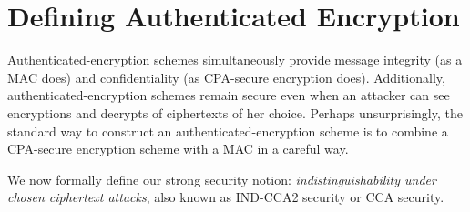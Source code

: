 \section{Defining Authenticated Encryption}

Authenticated-encryption schemes simultaneously provide message 
integrity (as a MAC does) and confidentiality (as CPA-secure encryption does).
Additionally, authenticated-encryption schemes remain secure even when 
an attacker can see encryptions and decrypts of ciphertexts of her choice.
Perhaps unsurprisingly, the standard way to construct an authenticated-encryption
scheme is to combine a CPA-secure encryption scheme with a MAC in a careful way.

We now formally define our strong security notion:
\emph{indistinguishability under chosen ciphertext attacks}, 
also known as IND-CCA2 security or CCA security.

